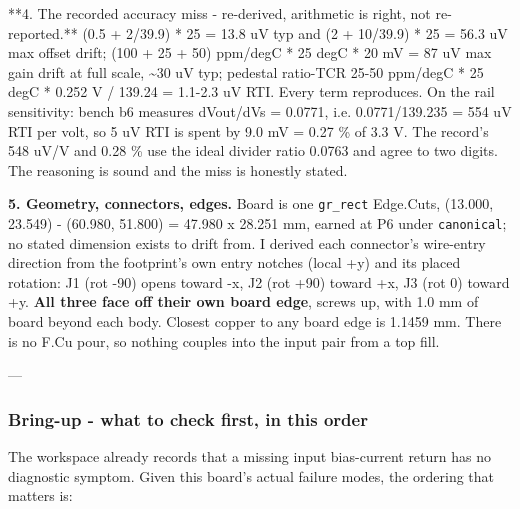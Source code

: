 \documentclass[11pt,a4paper]{article}
\begin{document}
{*}{*}4. The recorded accuracy miss - re-derived, arithmetic is right, not re-reported.{*}{*} (0.5 + 2/39.9) {*} 25 = 13.8 uV typ and (2 + 10/39.9) {*} 25 = 56.3 uV max offset drift; (100 + 25 + 50) ppm/degC {*} 25 degC {*} 20 mV = 87 uV max gain drift at full scale, \textasciitilde{}30 uV typ; pedestal ratio-TCR 25-50 ppm/degC {*} 25 degC {*} 0.252 V / 139.24 = 1.1-2.3 uV RTI. Every term reproduces. On the rail sensitivity: bench b6 measures dVout/dVs = 0.0771, i.e. 0.0771/139.235 = 554 uV RTI per volt, so 5 uV RTI is spent by 9.0 mV = 0.27 \% of 3.3 V. The record's 548 uV/V and 0.28 \% use the ideal divider ratio 0.0763 and agree to two digits. The reasoning is sound and the miss is honestly stated.

\textbf{5. Geometry, connectors, edges.} Board is one \texttt{gr\_rect} Edge.Cuts, (13.000, 23.549) - (60.980, 51.800) = 47.980 x 28.251 mm, earned at P6 under \texttt{canonical}; no stated dimension exists to drift from. I derived each connector's wire-entry direction from the footprint's own entry notches (local +y) and its placed rotation: J1 (rot -90) opens toward -x, J2 (rot +90) toward +x, J3 (rot 0) toward +y. \textbf{All three face off their own board edge}, screws up, with 1.0 mm of board beyond each body. Closest copper to any board edge is 1.1459 mm. There is no F.Cu pour, so nothing couples into the input pair from a top fill.

---

\subsubsection*{Bring-up - what to check first, in this order}
The workspace already records that a missing input bias-current return has no diagnostic symptom. Given this board's actual failure modes, the ordering that matters is:
\end{document}
